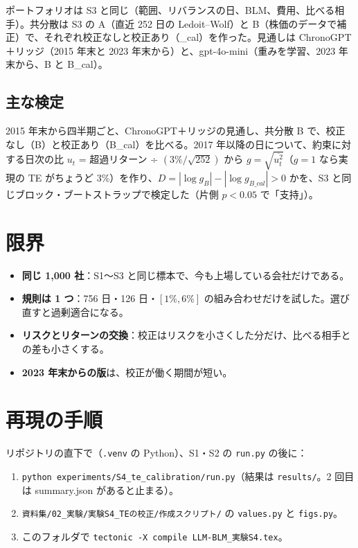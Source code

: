 \documentclass[xelatex,ja=standard,jafont=haranoaji,a4paper,10pt,openany]{bxjsreport}
\newcommand{\code}[1]{\texttt{#1}}
\begin{document}
ポートフォリオは S3 と同じ（範囲、リバランスの日、BLM、費用、比べる相手）。共分散は S3 の A（直近 252 日の Ledoit--Wolf）と B（株価のデータで補正）で、それぞれ校正なしと校正あり（\_cal）を作った。見通しは ChronoGPT＋リッジ（2015 年末と 2023 年末から）と、gpt-4o-mini（重みを学習、2023 年末から、B と B\_cal）。

\section{主な検定}

2015 年末から四半期ごと、ChronoGPT＋リッジの見通し、共分散 B で、校正なし（B）と校正あり（B\_cal）を比べる。2017 年以降の日について、約束に対する日次の比 $u_t$ = 超過リターン ÷ $(3\% / \sqrt{252})$ から $g = \sqrt{\overline{u_t^2}}$（$g = 1$ なら実現の TE がちょうど 3\%）を作り、$D = |\log g_B| - |\log g_{B\_cal}| > 0$ かを、S3 と同じブロック・ブートストラップで検定した（片側 $p < 0.05$ で「支持」）。



\chapter{限界}\label{ch:limits}

\begin{itemize}
\item \textbf{同じ 1,000 社}：S1〜S3 と同じ標本で、今も上場している会社だけである。
\item \textbf{規則は 1 つ}：756 日・126 日・$[1\%, 6\%]$ の組み合わせだけを試した。選び直すと過剰適合になる。
\item \textbf{リスクとリターンの交換}：校正はリスクを小さくした分だけ、比べる相手との差も小さくする。
\item \textbf{2023 年末からの版}は、校正が働く期間が短い。
\end{itemize}

\chapter*{再現の手順}

リポジトリの直下で（\code{.venv} の Python）、S1・S2 の \code{run.py} の後に：

\begin{enumerate}
\item \code{python experiments/S4\_te\_calibration/run.py}（結果は \code{results/}。2 回目は summary.json があると止まる）。
\item \code{資料集/02\_実験/実験S4\_TEの校正/作成スクリプト/} の \code{values.py} と \code{figs.py}。
\item このフォルダで \code{tectonic -X compile LLM-BLM\_実験S4.tex}。
\end{enumerate}
\end{document}
